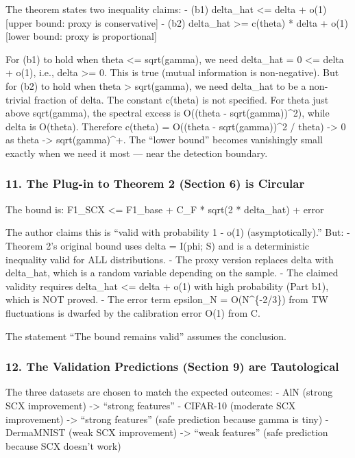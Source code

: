 \documentclass[
  12pt,
]{article}
\begin{document}
The theorem states two inequality claims: - (b1) delta\_hat \textless=
delta + o(1) {[}upper bound: proxy is conservative{]} - (b2) delta\_hat
\textgreater= c(theta) * delta + o(1) {[}lower bound: proxy is
proportional{]}

For (b1) to hold when theta \textless= sqrt(gamma), we need delta\_hat =
0 \textless= delta + o(1), i.e., delta \textgreater= 0. This is true
(mutual information is non-negative). But for (b2) to hold when theta
\textgreater{} sqrt(gamma), we need delta\_hat to be a non-trivial
fraction of delta. The constant c(theta) is not specified. For theta
just above sqrt(gamma), the spectral excess is O((theta -
sqrt(gamma))\^{}2), while delta is O(theta). Therefore c(theta) =
O((theta - sqrt(gamma))\^{}2 / theta) -\textgreater{} 0 as theta
-\textgreater{} sqrt(gamma)\^{}+. The ``lower bound'' becomes
vanishingly small exactly when we need it most --- near the detection
boundary.

\subsubsection{11. The Plug-in to Theorem 2 (Section 6) is
Circular}\label{the-plug-in-to-theorem-2-section-6-is-circular}

The bound is: F1\_SCX \textless= F1\_base + C\_F * sqrt(2 * delta\_hat)
+ error

The author claims this is ``valid with probability 1 - o(1)
(asymptotically).'' But: - Theorem 2's original bound uses delta =
I(phi; S) and is a deterministic inequality valid for ALL distributions.
- The proxy version replaces delta with delta\_hat, which is a random
variable depending on the sample. - The claimed validity requires
delta\_hat \textless= delta + o(1) with high probability (Part b1),
which is NOT proved. - The error term epsilon\_N = O(N\^{}\{-2/3\}) from
TW fluctuations is dwarfed by the calibration error O(1) from C.

The statement ``The bound remains valid'' assumes the conclusion.

\subsubsection{12. The Validation Predictions (Section 9) are
Tautological}\label{the-validation-predictions-section-9-are-tautological}

The three datasets are chosen to match the expected outcomes: - AlN
(strong SCX improvement) -\textgreater{} ``strong features'' - CIFAR-10
(moderate SCX improvement) -\textgreater{} ``strong features'' (safe
prediction because gamma is tiny) - DermaMNIST (weak SCX improvement)
-\textgreater{} ``weak features'' (safe prediction because SCX doesn't
work)
\end{document}
